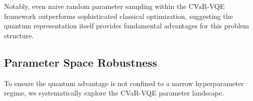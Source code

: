 Notably, even naive random parameter sampling within the CVaR-VQE framework outperforms sophisticated classical optimization, suggesting the quantum representation itself provides fundamental advantages for this problem structure.

\subsection{Parameter Space Robustness}

To ensure the quantum advantage is not confined to a narrow hyperparameter regime, we systematically explore the CVaR-VQE parameter landscape.


